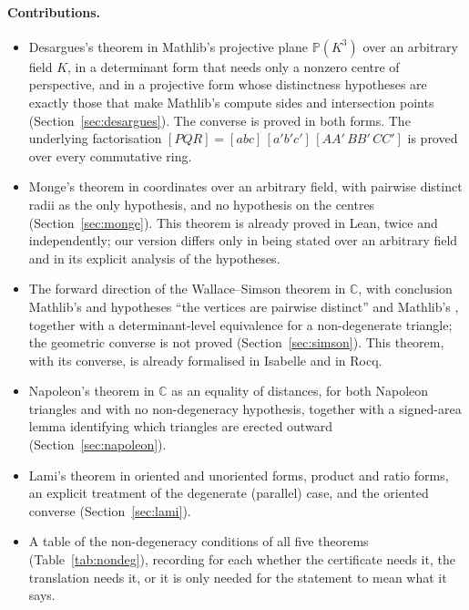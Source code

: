 \documentclass[11pt]{article}
\theoremstyle{definition}
\theoremstyle{remark}
\newcommand{\CC}{\mathbb{C}}
\newcommand{\PP}{\mathbb{P}}
\begin{document}
\paragraph{Contributions.}
\begin{itemize}
\item Desargues's theorem in Mathlib's projective plane $\PP(K^3)$ over an arbitrary field $K$,
in a determinant form that needs only a nonzero centre of perspective, and in a projective form
whose distinctness hypotheses are exactly those that make Mathlib's  compute sides
and intersection points (Section~\ref{sec:desargues}). The converse is proved in both forms. The
underlying factorisation $[PQR]=[abc]\,[a'b'c']\,[AA'\,BB'\,CC']$ is proved over every
commutative ring.
\item Monge's theorem in coordinates over an arbitrary field, with pairwise distinct radii as the
only hypothesis, and no hypothesis on the centres (Section~\ref{sec:monge}). This theorem is
already proved in Lean, twice and independently; our version differs only in being stated over an
arbitrary field and in its explicit analysis of the hypotheses.
\item The forward direction of the Wallace--Simson theorem in $\CC$, with conclusion Mathlib's
 and hypotheses ``the vertices are pairwise distinct'' and Mathlib's
, together with a determinant-level equivalence for a
non-degenerate triangle; the geometric converse is not proved (Section~\ref{sec:simson}). This
theorem, with its converse, is already formalised in Isabelle and in Rocq.
\item Napoleon's theorem in $\CC$ as an equality of distances, for both Napoleon triangles and
with no non-degeneracy hypothesis, together with a signed-area lemma identifying which triangles
are erected outward (Section~\ref{sec:napoleon}).
\item Lami's theorem in oriented and unoriented forms, product and ratio forms, an explicit
treatment of the degenerate (parallel) case, and the oriented converse
(Section~\ref{sec:lami}).
\item A table of the non-degeneracy conditions of all five theorems
(Table~\ref{tab:nondeg}), recording for each whether the certificate needs it, the translation
needs it, or it is only needed for the statement to mean what it says.
\end{itemize}
\end{document}
